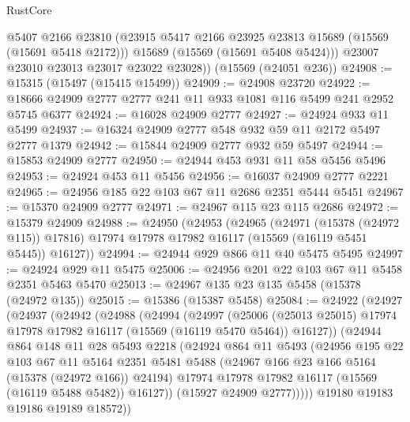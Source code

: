 \begin{lexlean}{RustCore}
\begin{coremodule}
          @5407
          @2166
          @23810
          (@23915 @5417 @2166 @23925 @23813 @15689 (@15569 (@15691 @5418 @2172)))
          @15689
          (@15569 (@15691 @5408 @5424)))
        @23007
        @23010
        @23013
        @23017
        @23022
        @23028))
    (@15569 (@24051 @236))
@24908 := @15315 (@15497 (@15415 @15499))
@24909 := @24908 @23720
@24922 := @18666 @24909 @2777 @2777 @241 @11 @933 @1081 @116 @5499 @241 @2952 @5745 @6377
@24924 := @16028 @24909 @2777
@24927 := @24924 @933 @11 @5499
@24937 := @16324 @24909 @2777 @548 @932 @59 @11 @2172 @5497 @2777 @1379
@24942 := @15844 @24909 @2777 @932 @59 @5497
@24944 := @15853 @24909 @2777
@24950 := @24944 @453 @931 @11 @58 @5456 @5496
@24953 := @24924 @453 @11 @5456
@24956 := @16037 @24909 @2777 @2221
@24965 := @24956 @185 @22 @103 @67 @11 @2686 @2351 @5444 @5451
@24967 := @15370 @24909 @2777
@24971 := @24967 @115 @23 @115 @2686
@24972 := @15379 @24909
@24988 := @24950
    (@24953
      (@24965
        (@24971 (@15378 (@24972 @115)) @17816)
        @17974
        @17978
        @17982
        @16117
        (@15569 (@16119 @5451 @5445))
        @16127))
@24994 := @24944 @929 @866 @11 @40 @5475 @5495
@24997 := @24924 @929 @11 @5475
@25006 := @24956 @201 @22 @103 @67 @11 @5458 @2351 @5463 @5470
@25013 := @24967 @135 @23 @135 @5458 (@15378 (@24972 @135))
@25015 := @15386 (@15387 @5458)
@25084 := @24922
    (@24927
      (@24937
        (@24942
          (@24988
            (@24994
              (@24997
                (@25006
                  (@25013 @25015)
                  @17974
                  @17978
                  @17982
                  @16117
                  (@15569 (@16119 @5470 @5464))
                  @16127))
              (@24944
                @864
                @148
                @11
                @28
                @5493
                @2218
                (@24924
                  @864
                  @11
                  @5493
                  (@24956
                    @195
                    @22
                    @103
                    @67
                    @11
                    @5164
                    @2351
                    @5481
                    @5488
                    (@24967 @166 @23 @166 @5164 (@15378 (@24972 @166)) @24194)
                    @17974
                    @17978
                    @17982
                    @16117
                    (@15569 (@16119 @5488 @5482))
                    @16127))
                (@15927 @24909 @2777)))))
        @19180
        @19183
        @19186
        @19189
        @18572))

\end{coremodule}
\end{lexlean}
